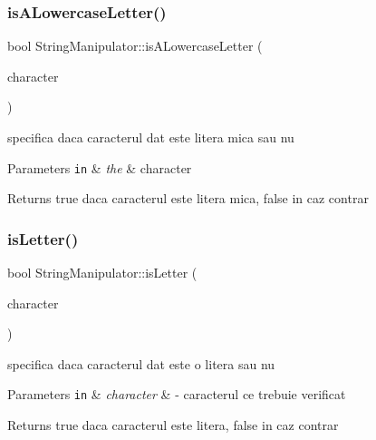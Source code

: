 \subsubsection{\texorpdfstring{is\+A\+Lowercase\+Letter()}{isALowercaseLetter()}}
{\footnotesize\ttfamily bool String\+Manipulator\+::is\+A\+Lowercase\+Letter (\begin{DoxyParamCaption}\item[{const Q\+Char \&}]{character }\end{DoxyParamCaption})\hspace{0.3cm}{\ttfamily [static]}}

specifica daca caracterul dat este litera mica sau nu


\begin{DoxyParams}[1]{Parameters}
\mbox{\tt in}  & {\em the} & character\\
\hline
\end{DoxyParams}
\begin{DoxyReturn}{Returns}
true daca caracterul este litera mica, false in caz contrar 
\end{DoxyReturn}
\mbox{\label{class_string_manipulator_a7deb1f37fd0efd4eddfb4cef8ed6eca6}} 
\subsubsection{\texorpdfstring{is\+Letter()}{isLetter()}}
{\footnotesize\ttfamily bool String\+Manipulator\+::is\+Letter (\begin{DoxyParamCaption}\item[{const Q\+Char \&}]{character }\end{DoxyParamCaption})\hspace{0.3cm}{\ttfamily [static]}}

specifica daca caracterul dat este o litera sau nu


\begin{DoxyParams}[1]{Parameters}
\mbox{\tt in}  & {\em character} & -\/ caracterul ce trebuie verificat\\
\hline
\end{DoxyParams}
\begin{DoxyReturn}{Returns}
true daca caracterul este litera, false in caz contrar 
\end{DoxyReturn}
\mbox{\label{class_string_manipulator_af3dc83218b174085453f06453b93d17b}} 
